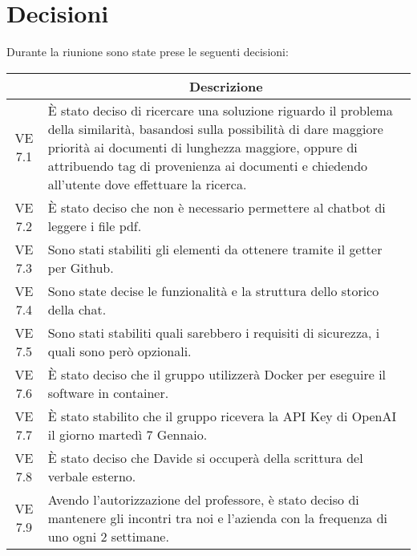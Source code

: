 

\section{Decisioni}

Durante la riunione sono state prese le seguenti decisioni:

\vspace{0.5cm}

\begin{table}[htbp]
    \centering
    \begin{tabular}{|c|p{}|}
        \hline
        \rowcolor[gray]{0.75}
        \multicolumn{1}{|c|}{\textbf{Codice}} & \multicolumn{1}{|c|}{\textbf{Descrizione}}\\
        \hline
        VE 7.1 & È stato deciso di ricercare una soluzione riguardo il problema della similarità, basandosi sulla possibilità di dare maggiore priorità ai documenti di lunghezza maggiore, oppure di attribuendo tag di provenienza ai documenti e chiedendo all'utente dove effettuare la ricerca. \\
        VE 7.2 & È stato deciso che non è necessario permettere al chatbot di leggere i file pdf. \\
        VE 7.3 & Sono stati stabiliti gli elementi da ottenere tramite il getter per Github. \\
        VE 7.4 & Sono state decise le funzionalità e la struttura dello storico della chat. \\
        VE 7.5 & Sono stati stabiliti quali sarebbero i requisiti di sicurezza, i quali sono però opzionali. \\
        VE 7.6 & È stato deciso che il gruppo utilizzerà Docker per eseguire il software in container. \\
        VE 7.7 & È stato stabilito che il gruppo ricevera la API Key di OpenAI il giorno martedì 7 Gennaio. \\
        VE 7.8 & È stato deciso che Davide si occuperà della scrittura del verbale esterno. \\
        VE 7.9 & Avendo l'autorizzazione del professore, è stato deciso di mantenere gli incontri tra noi e l'azienda con la frequenza di uno ogni 2 settimane. \\
        \hline
    \end{tabular}
\end{table}
